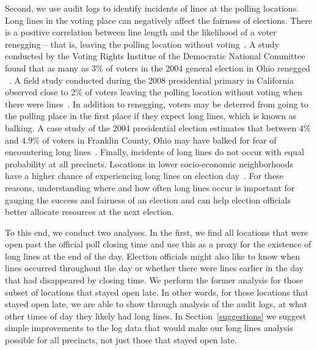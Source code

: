 \documentclass[letterpaper,twocolumn,10pt]{article}
\begin{document}
Second, we use audit logs to identify incidents of lines at the polling
locations. Long lines in the voting place can
negatively affect the fairness of elections. There is a positive correlation
between line length and the likelihood of a voter renegging -- that is, leaving
the polling location without voting~\cite{Spencer2010}. A study conducted by the
Voting Rights Institue of the Democratic National Committee found that as many
as $3\%$ of voters in the 2004 general election in Ohio renegged
~\cite{DNC2005}. A field study conducted 
during the 2008 presidential primary in California observed close to $2\%$
of voters leaving the polling location without voting when there were
lines~\cite{Spencer2010}. In addition to renegging, voters may be deterred from
going to the polling place in the first place if they expect long lines, which is
known as balking. A case study of the 2004 presidential election estimates that
between $4\%$ and $4.9\%$ of voters in Franklin County, Ohio may have balked for
fear of encountering long lines~\cite{Allen2006}. Finally, incidents of long
lines do not occur with equal probability at all precincts. Locations in lower
socio-economic neighborhoods have a higher chance of experiencing long lines on
election day~\cite{Spencer2010,DNC2005}. For these reasons, understanding where  
and how often long lines occur is important for gauging the success and fairness
of an election and can help election officials better allocate resources at the
next election. 

To this end, we conduct two analyses. In the first, we find all
locations that were open past the official poll closing time and use this as a
proxy for the existence of long lines at the end of the day. Election officials
might also like to know when lines occurred throughout the day or whether there
were lines earlier in the day that had disappeared by closing time. We perform
the former 
analysis for those subset of locations that stayed open late. In other words,
for those locations that stayed open late, we are able to show through analysis
of the audit logs, at what other times of day they likely had long
lines. In Section~\ref{suggestions} we suggest simple improvements to the log
data that would make our long lines analysis possible for all precincts, not
just those that stayed open late.

\end{document}
